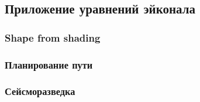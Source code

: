 \subsection{Приложение уравнений эйконала}
\label{sec:applivation-eikonal-equations}

\subsubsection{Shape from shading}
\label{sec:shape-from-shading}

\subsubsection{Планирование пути}
\label{sec:path-planning}

\subsubsection{Сейсморазведка}
\label{sec:seismic-examination}


